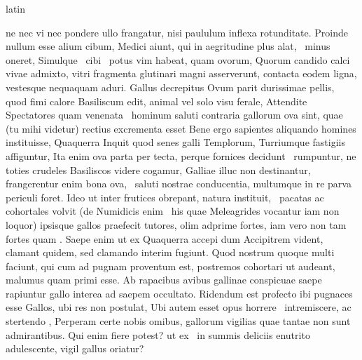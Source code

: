 \documentclass[12pt]{book}
\renewenvironment{latin}
    	{\begin{hyphenrules}{latin}}
    	{\end{hyphenrules}}
\begin{document}
\begin{pages}
\begin{latin}
\begin{Leftside}
                    ne nec vi nec pondere ullo frangatur, 
                    nisi paululum inflexa rotunditate. 
                    Proinde nullum esse alium cibum, Medici aiunt, 
                    qui in aegritudine plus alat,  \ampersand\ minus oneret, 
                    Simulque  \ampersand\ cibi  \ampersand\ potus vim habeat, quam ovorum, 
                    Quorum candido calci vivae admixto, vitri fragmenta glutinari magni  asserverunt,  contacta eodem ligna, vestesque nequaquam aduri. 
                    Gallus decrepitus Ovum parit durissimae pellis, quod fimi calore  Basiliscum edit, animal vel solo visu ferale, 
                    Attendite Spectatores quam venenata  \ampersand\ hominum saluti contraria gallorum ova sint, quae (tu mihi videtur) rectius excrementa esset 
                    Bene ergo sapientes aliquando homines instituisse, Quaquerra Inquit quod senes galli Templorum, Turriumque fastigiis affiguntur, 
                    Ita enim ova parta per tecta, perque fornices decidunt  \ampersand\ rumpuntur,   
                    ne toties crudeles Basiliscos videre cogamur, Galliae illuc non destinantur, frangerentur enim bona ova,  \ampersand\ saluti nostrae conducentia, multumque in re parva periculi foret. 
                    Ideo ut inter frutices obrepant, natura instituit,  \ampersand\ pacatas ac cohortales volvit (de Numidicis enim  \ampersand\ his quae Meleagrides vocantur iam non loquor) ipsisque gallos praefecit tutores, olim adprime fortes, 
                    iam vero non tam fortes quam . 
                    Saepe enim ut ex Quaquerra accepi dum Accipitrem vident, clamant quidem, sed clamando interim fugiunt. 
                    Quod nostrum quoque multi faciunt, qui cum ad pugnam proventum est, postremos cohortari ut audeant, malumus quam primi esse. 
                    Ab rapacibus avibus gallinae conspicuae saepe rapiuntur gallo interea ad saepem occultato. 
                    Ridendum est profecto ibi pugnaces esse Gallos, ubi res non postulat, 
                    Ubi autem esset opus horrere  \ampersand\ intremiscere, ac stertendo , Perperam certe nobis omibus, gallorum vigilias quae tantae non sunt admirantibus.
                    Qui enim fiere potest? 
                    ut ex   \ampersand\ in summis deliciis enutrito adulescente, vigil gallus oriatur? 

\end{Leftside}
\end{latin}
\end{pages}
\end{document}
